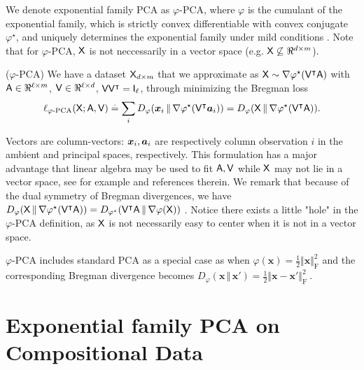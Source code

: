 \documentclass{article}
\begin{document}
We denote exponential family PCA as $\varphi$-PCA, where $\varphi$
is the cumulant of the exponential family, which
is strictly convex differentiable with convex conjugate $\varphi^\star$,
and uniquely determines the exponential family under mild conditions \cite{bIA}.
Note that for $\varphi$-PCA, $\mathsf{X}$ is not neccessarily in a vector space
(e.g. $\mathsf{X}\not\subseteq\Re^{d\times m}$).
\begin{mdframed}[style=MyFrame]
($\varphi$-PCA) We have a dataset $\mathsf{X}_{d\times m}$ that we approximate as
$\mathsf{X} \sim \nabla\varphi^\star (\mathsf{V}^\intercal \mathsf{A})$
with $\mathsf{A}\in\Re^{\ell\times m}$, $\mathsf{V}\in\Re^{\ell \times d}$, $\mathsf{V}\mathsf{V}^\intercal = \mathsf{I}_\ell$,
through minimizing the Bregman loss
\begin{equation}
\ell_{\varphi\text{-}\mathrm{PCA}}(\mathsf{X}; \mathsf{A}, \mathsf{V})
\stackrel{\mathrm{.}}{=}
\sum_i D_\varphi(\bm{x}_i\,\Vert\,\nabla\varphi^\star(\mathsf{V}^\intercal \bm{a}_i))
=
D_\varphi(\mathsf{X}\,\Vert\,\nabla\varphi^\star(\mathsf{V}^\intercal \mathsf{A})).\label{eqEXP-PCA}
\end{equation}
\end{mdframed}
Vectors are column-vectors: $\bm{x}_i, \bm{a}_i$
are respectively column observation $i$ in the ambient and principal spaces, respectively.
This formulation has a major advantage that linear algebra may be
used to fit $\mathsf{A}, \mathsf{V}$ while $\mathsf{X}$ may not lie in a vector space, see
for example \cite{cdsAG,lGPCA} and references therein.
We remark that because
of the dual symmetry of Bregman divergences, we have
$D_\varphi(\mathsf{X}\,\Vert\,\nabla\varphi^\star(\mathsf{V}^\intercal\mathsf{A}))
= D_{\varphi^\star}(\mathsf{V}^\intercal\mathsf{A}\,\Vert\,\nabla\varphi(\mathsf{X}))$ \cite{bnnBV}.
Notice there exists a little "hole" in the
$\varphi$-PCA definition, as $\mathsf{X}$ is not necessarily easy to center
when it is not in a vector space.

$\varphi$-PCA includes standard PCA as a special case as when $\varphi(\bm{x})=\frac{1}{2}\Vert\bm{x}\Vert_{\mathrm{F}}^2$ and
the corresponding Bregman divergence becomes $D_\varphi(\bm{x}\,\Vert\,\bm{x}')=\frac{1}{2}\Vert\bm{x}-\bm{x}'\Vert_{\mathrm{F}}^2\:$.

\section{Exponential family PCA on Compositional Data}
\end{document}
